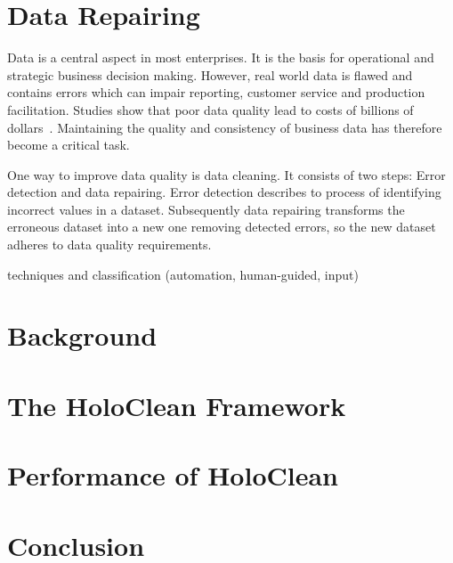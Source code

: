 
\section{Data Repairing}\label{sec:introduction}
  Data is a central aspect in most enterprises.
  It is the basis for operational and strategic business decision making.
  However, real world data is flawed and contains errors which can impair reporting, customer service and production facilitation.
  Studies show that poor data quality lead to costs of billions of dollars~\cite{Redman:quality_disaster, English:cost_of_low_qual}.
  Maintaining the quality and consistency of business data has therefore become a critical task.

  One way to improve data quality is data cleaning.
  It consists of two steps: Error detection and data repairing.
  Error detection describes to process of identifying incorrect values in a dataset.
  Subsequently data repairing transforms the erroneous dataset into a new one removing detected errors, so the new dataset adheres to data quality requirements.
  
  techniques and classification (automation, human-guided, input)

\section{Background}\label{sec:background}

\section{The HoloClean Framework}\label{sec:framework}

\section{Performance of HoloClean}\label{sec:performance}

\section{Conclusion}\label{sec:conclusion}